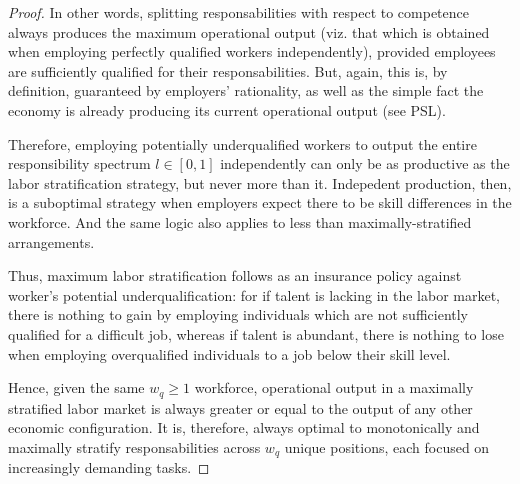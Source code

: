 \documentclass[hidelinks, nonatbib]{elsarticle}
\begin{document}
\begin{lemma}
\begin{proof}
        In other words, splitting responsabilities with respect to competence always produces the maximum operational output (viz. that which is obtained when employing perfectly qualified workers independently), provided employees are sufficiently qualified for their responsabilities. But, again, this is, by definition, guaranteed by employers' rationality, as well as the simple fact the economy is already producing its current operational output (see PSL). 
        
        Therefore, employing potentially underqualified workers to output the entire responsibility spectrum $l \in [0,1]$ independently can only be as productive as the labor stratification strategy, but never more than it. Indepedent production, then, is a suboptimal strategy when employers expect there to be skill differences in the workforce. And the same logic also applies to less than maximally-stratified arrangements.
        
        Thus, maximum labor stratification follows as an insurance policy against worker's potential underqualification: for if talent is lacking in the labor market, there is nothing to gain by employing individuals which are not sufficiently qualified for a difficult job, whereas if talent is abundant, there is nothing to lose when employing overqualified individuals to a job below their skill level.

        Hence, given the same $w_q \geq 1$ workforce, operational output in a maximally stratified labor market is always greater or equal to the output of any other economic configuration. It is, therefore, always optimal to monotonically and maximally stratify responsabilities across $w_q$ unique positions, each focused on increasingly demanding tasks.
    \end{proof}
\end{lemma}
\end{document}
